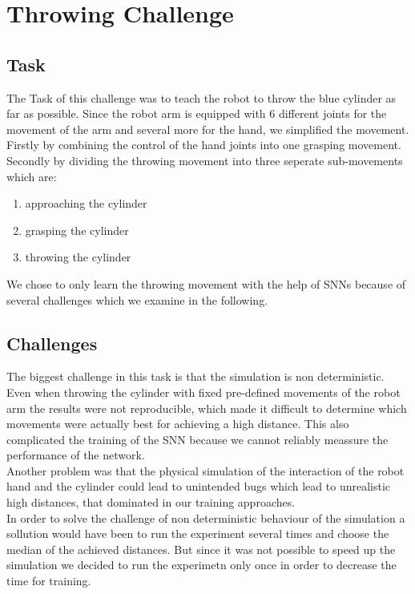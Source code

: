 \section{Throwing Challenge}
\subsection{Task}
The Task of this challenge was to teach the robot to throw the blue cylinder as far as possible. Since the robot arm is equipped with 6 different joints for the movement of the arm and several more for the hand, we simplified the movement. Firstly by combining the control of the hand joints into one grasping movement. Secondly by dividing the throwing movement into three seperate sub-movements which are:
 \begin{enumerate}
\item approaching the cylinder
\item grasping the cylinder
\item throwing the cylinder
\end{enumerate}
We chose to only learn the throwing movement with the help of SNNs because of several challenges which we examine in the following.

\subsection{Challenges}
\label{sec:challenges}
The biggest challenge in this task is that the simulation is non deterministic. Even when throwing the cylinder with fixed pre-defined movements of the robot arm the results were not reproducible, which made it difficult to determine which movements were actually best for achieving a high distance. This also complicated the training of the SNN because we cannot reliably meassure the performance of the network.\\
Another problem was that the physical simulation of the interaction of the robot hand and the cylinder could lead to unintended bugs which lead to unrealistic high distances, that dominated in our training approaches.\\
In order to solve the challenge of non deterministic behaviour of the simulation a sollution would have been to run the experiment several times and choose the median of the achieved distances. But since it was not possible to speed up the simulation we decided to run the experimetn only once in order to decrease the time for training.\\




